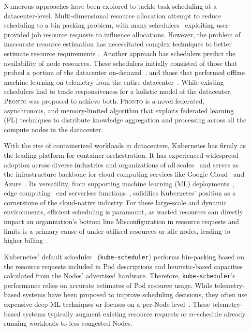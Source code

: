 Numerous approaches have been explored to tackle task scheduling at a
datacenter-level. Multi-dimensional resource allocation attempt to reduce
scheduling to a bin packing problem, with many schedulers~\cite{borg, kube}
exploiting user-provided job resource requests to influence allocations.
However, the problem of inaccurate resource estimation has necessitated complex
techniques to better estimate resource requirements~\cite{}. Another approach
has schedulers predict the availability of node resources. These schedulers
initially consisted of those that probed a portion of the datacenter
on-demand~\cite{}, and those that performed offline machine learning on
telemetry from the entire datacenter~\cite{}. While existing schedulers had to
trade responsiveness for a holistic model of the datacenter, \textsc{Pronto} was
proposed to achieve both. \textsc{Pronto} is a novel federated, asynchronous,
and memory-limited algorithm that exploits federated learning (FL) techniques to
distribute knowledge aggregation and processing across all the compute nodes in
the datacenter.

With the rise of containerized workloads in datacenters, Kubernetes has firmly
as the leading platform for container orchestration. It has experienced
widespread adoption across diverse industries and organizations of all
scales~\cite{kubernetes-adoption-statistics} and serves as the infrastructure
backbone for cloud computing services like Google Cloud~\cite{google-gke} and
Azure~\cite{azure-aks}. Its versatility, from supporting machine learning (ML)
deployments~\cite{kubernetes-ai}, edge computing~\cite{cloudraft} end serverless
functions~\cite{knative, openwhisk}, solidifies Kubernetes' position as a
cornerstone of the cloud-native industry. For these large-scale and dynamic
environments, efficient scheduling is paramount, as wasted resources can
directly impact an organization's bottom line Misconfiguration in resource
requests and limits is a primary cause of under-utilised resources or idle
nodes, leading to higher billing \cite{cost-strategies,
bin-packing-and-cost-savings-in-kubernetes-clusters-on-aws}.

Kubernetes' default scheduler~\cite{kube-scheduler} (\texttt{kube-scheduler})
performs bin-packing based on the resource requests included in Pod descriptions
and heuristic-based capacities calculated from the Nodes' advertised hardware.
Therefore, \texttt{kube-scheduler}'s performance relies on accurate estimates
of Pod resource usage. While telemetry-based systems have been proposed to
improve scheduling decisions, they often use expensive deep-ML techniques
\cite{bao2019deep, peng2021dl2} or focuses on a per-Node
level~\cite{yang2019design}. These telemetry-based systems typically augment
existing resource requests or re-schedule already running workloads to less
congested Nodes.

